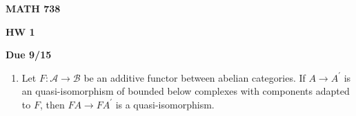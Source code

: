 \documentclass[12pt]{amsart}
\begin{document}
\centerline{\bf MATH 738}
\centerline{\bf HW 1} 
\centerline{\bf Due 9/15}

\vspace{2em}

\begin{enumerate}
    
    \item Let $F: \mathcal A \to \mathcal B$ be an additive functor between abelian 
    categories. If $A \to A^\prime$ is an quasi-isomorphism of bounded below complexes 
    with components adapted to $F$, then $FA \to FA^\prime$ is a quasi-isomorphism. 

\end{enumerate}
\end{document}
